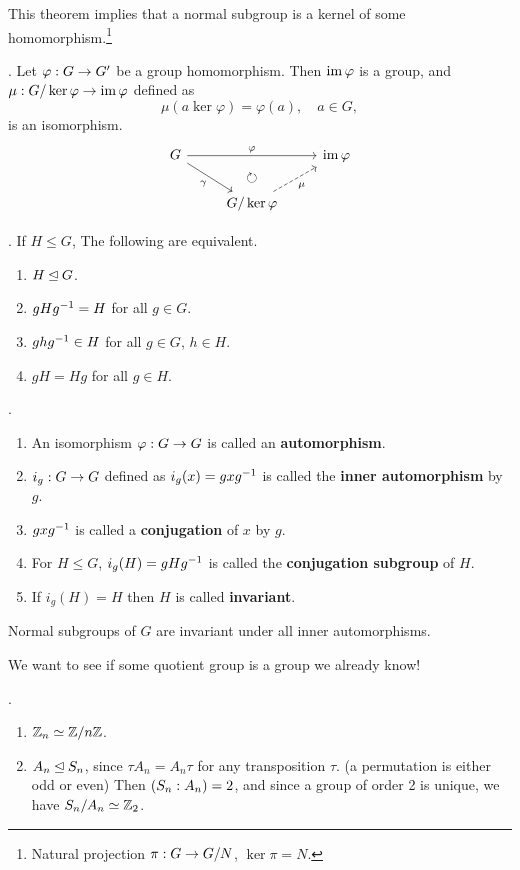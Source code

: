 This theorem implies that a normal subgroup is a kernel of some homomorphism.\footnote{Natural projection \(\pi : G \rightarrow G/N\), \(\ker\pi = N\).}

\thm.  Let \(\varphi : G \rightarrow G'\) be a group homomorphism. Then \(\operatorname{im} \varphi\) is a group, and \(\mu: G/\ker\varphi \rightarrow \operatorname{im} \varphi\) defined as
\[
    \mu(a \ker\varphi) = \varphi(a), \quad a \in G,
\]
is an isomorphism.
\[
    \begin{tikzcd}
        G \arrow{rr}{\varphi} \arrow[swap]{dr}{\gamma} & \arrow[d, phantom, "\circlearrowright"]& \im \varphi \\
        & G/ \ker\varphi \arrow[dashed,swap]{ur}{\mu} &
    \end{tikzcd}
\]

\thm. If \(H \leq G\), The following are equivalent.
\begin{enumerate}
    \item \(H \unlhd G\).
    \item \(gHg^{-1} = H\) for all \(g \in G\).
    \item \(ghg^{-1} \in H\) for all \(g \in G\), \(h \in H\).
    \item \(gH = Hg\) for all \(g \in H\).
\end{enumerate}

. 
\begin{enumerate}
    \item An isomorphism \(\varphi : G \rightarrow G\) is called an \textbf{automorphism}.
    \item \(i_g : G \rightarrow G\) defined as \(i_g(x) = gxg^{-1}\) is called the \textbf{inner automorphism} by \(g\).
    \item \(gxg^{-1}\) is called a \textbf{conjugation} of \(x\) by \(g\).
    \item For \(H \leq G\), \(i_g(H) = gHg^{-1}\) is called the \textbf{conjugation subgroup} of \(H\).
    \item If \(i_g(H) = H\) then \(H\) is called \textbf{invariant}.
\end{enumerate}

\rmk Normal subgroups of \(G\) are invariant under all inner automorphisms.

\pagebreak


We want to see if some quotient group is a group we already know!

\ex.
\begin{enumerate}
    \item \(\mathbb{Z}_n \simeq \mathbb{Z} / n\mathbb{Z}\).
    \item \(A_n \unlhd S_n\), since \(\tau A_n = A_n \tau\) for any transposition \(\tau\). (a permutation is either odd or even) Then \(\left(S_n : A_n\right) = 2\), and since a group of order 2 is unique, we have \(S_n / A_n \simeq \mathbb{Z}_2\).
\end{enumerate}

